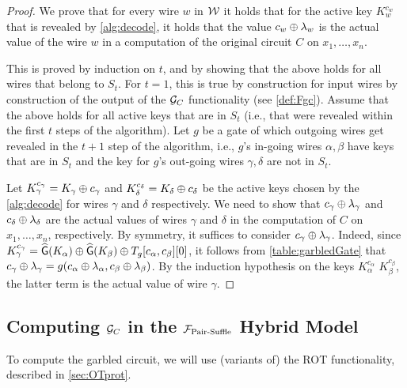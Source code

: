 \begin{proof}
We prove that for every wire $w$ in ${\cal W}$ it holds that for the active key $K_{w}^{c_{w}}$ that is revealed by \cref{alg:decode}, it holds that the value $c_w\oplus\lambda_w$ is the actual value of the wire $w$ in a computation of the original circuit $C$ on $x_1,\ldots,x_n$. 

This is proved by induction on $t$, and by showing that the above holds for all wires that belong to $S_t$. For $t=1$, this is true by construction for input wires by construction of the output of the $\GC$ functionality (see \cref{def:Fgc}).
Assume that the above holds for all active keys that are in $S_t$ (i.e., that were revealed within the first $t$ steps of the algorithm). Let $g$ be a gate of which outgoing wires get revealed in the $t+1$ step of the algorithm, i.e., $g$'s in-going wires $\alpha,\beta$ have keys that are in $S_t$ and the key  for $g$'s out-going wires $\gamma,\delta$ are not in $S_t$.   

Let $K_\gamma^{c_\gamma} = K_\gamma\oplus{c_\gamma}$ and $K_\delta^{c_\delta} = K_\delta\oplus{c_\delta}$ be the active keys chosen by the \cref{alg:decode} for wires $\gamma$ and $\delta$ respectively.  We need to show that  ${c_\gamma}\oplus \lambda_\gamma$ and ${c_\delta}\oplus \lambda_\delta$ are the actual values of wires $\gamma$ and $\delta$ in the computation of $C$ on $x_1,\ldots,x_n$, respectively. By symmetry, it suffices to consider ${c_\gamma}\oplus \lambda_\gamma$. Indeed, since $K_\gamma^{c_\gamma} = \widehat{\mathsf{G}}(K_\alpha)\oplus \widehat{\mathsf{G}}(K_\beta)\oplus T_g[c_\alpha,c_\beta][0]$, it follows from \cref{table:garbledGate} that 
$c_\gamma \oplus \lambda_\gamma = g(c_\alpha\oplus\lambda_\alpha,c_\beta\oplus\lambda_\beta)$. By the induction hypothesis on the keys $K_\alpha^{c_\alpha}$ $K_\beta^{c_\beta}$, the latter term is the actual value of wire $\gamma$.
\end{proof}
\begin{lemma}[security of $\GC$]\label{lem:gcPrivate}
\end{lemma}




\subsection{Computing $\mathcal{G}_C$ in the ${\cal F}_{\operatorname{Pair-Suffle}}$ Hybrid Model}
To compute the garbled circuit, we will use (variants of) the ROT functionality, described in \cref{sec:OTprot}.


